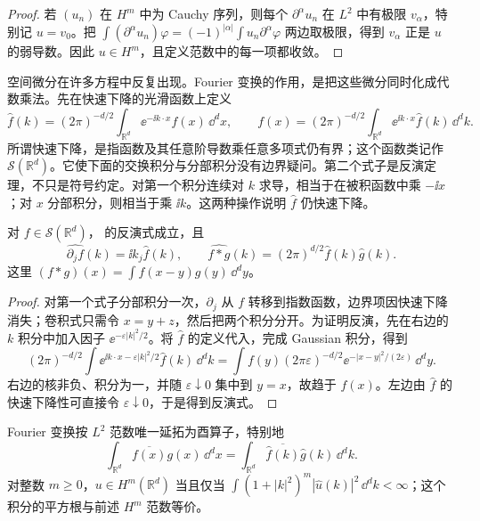 \begin{proof}
若 \((u_n)\) 在 \(H^m\) 中为 Cauchy 序列，则每个 \(\partial^\alpha u_n\) 在 \(L^2\) 中有极限 \(v_\alpha\)，特别记 \(u=v_0\)。把
\(\int(\partial^\alpha u_n)\varphi=(-1)^{|\alpha|}\int u_n\partial^\alpha\varphi\)
两边取极限，得到 \(v_\alpha\) 正是 \(u\) 的弱导数。因此 \(u\in H^m\)，且定义范数中的每一项都收敛。
\end{proof}

空间微分在许多方程中反复出现。Fourier 变换的作用，是把这些微分同时化成代数乘法。先在快速下降的光滑函数上定义
\begin{equation}
 \widehat f(k)=(2\pi)^{-d/2}\int_{\mathbb R^d}
       \ee^{-\ii k\cdot x}f(x)\,\dd^dx,
 \qquad
 f(x)=(2\pi)^{-d/2}\int_{\mathbb R^d}
       \ee^{\ii k\cdot x}\widehat f(k)\,\dd^dk.
 \label{eq:advanced-fourier-pair}
\end{equation}
所谓快速下降，是指函数及其任意阶导数乘任意多项式仍有界；这个函数类记作 \(\mathcal S(\mathbb R^d)\)。它使下面的交换积分与分部积分没有边界疑问。第二个式子是反演定理，不只是符号约定。对第一个积分连续对 \(k\) 求导，相当于在被积函数中乘 \(-\ii x\)；对 \(x\) 分部积分，则相当于乘 \(\ii k\)。这两种操作说明 \(\widehat f\) 仍快速下降。

\begin{proposition}
对 \(f\in\mathcal S(\mathbb R^d)\)， 的反演式成立，且
\[
 \widehat{\partial_jf}(k)=\ii k_j\widehat f(k),
 \qquad
 \widehat{f*g}(k)=(2\pi)^{d/2}\widehat f(k)\widehat g(k).
\]
这里 \((f*g)(x)=\int f(x-y)g(y)\,\dd^dy\)。
\end{proposition}

\begin{proof}
对第一个式子分部积分一次，\(\partial_j\) 从 \(f\) 转移到指数函数，边界项因快速下降消失；卷积式只需令 \(x=y+z\)，然后把两个积分分开。为证明反演，先在右边的 \(k\) 积分中加入因子 \(\ee^{-\varepsilon|k|^2/2}\)。将 \(\widehat f\) 的定义代入，完成 Gaussian 积分，得到
\[
 (2\pi)^{-d/2}\int\ee^{\ii k\cdot x-\varepsilon|k|^2/2}\widehat f(k)\,\dd^dk
 =\int f(y)(2\pi\varepsilon)^{-d/2}
     \ee^{-|x-y|^2/(2\varepsilon)}\,\dd^dy.
\]
右边的核非负、积分为一，并随 \(\varepsilon\downarrow0\) 集中到 \(y=x\)，故趋于 \(f(x)\)。左边由 \(\widehat f\) 的快速下降性可直接令 \(\varepsilon\downarrow0\)，于是得到反演式。
\end{proof}

\begin{proposition}
Fourier 变换按 \(L^2\) 范数唯一延拓为酉算子，特别地
\[
 \int_{\mathbb R^d}\overline{f(x)}g(x)\,\dd^dx
 =\int_{\mathbb R^d}\overline{\widehat f(k)}\widehat g(k)\,\dd^dk.
\]
对整数 \(m\ge0\)，\(u\in H^m(\mathbb R^d)\) 当且仅当
\(\int(1+|k|^2)^m|\widehat u(k)|^2\,\dd^dk<\infty\)；这个积分的平方根与前述 \(H^m\) 范数等价。
\end{proposition}

